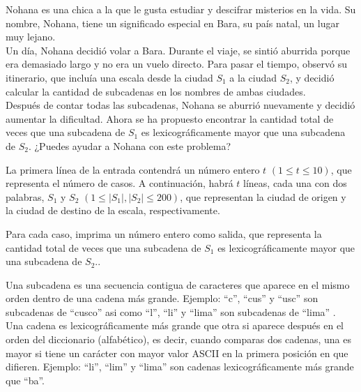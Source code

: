 
Nohana es una chica a la que le gusta estudiar y descifrar misterios en la vida. Su nombre, Nohana, tiene un significado especial en Bara, su país natal, un lugar muy lejano.\\

Un día, Nohana decidió volar a Bara. Durante el viaje, se sintió aburrida porque era demasiado largo y no era un vuelo directo. Para pasar el tiempo, observó su itinerario, que incluía una escala desde la ciudad $S_1$ a la ciudad $S_2$, y decidió calcular la cantidad de subcadenas en los nombres de ambas ciudades.\\

Después de contar todas las subcadenas, Nohana se aburrió nuevamente y decidió aumentar la dificultad. Ahora se ha propuesto encontrar la cantidad total de veces que una subcadena de $S_1$ es lexicográficamente mayor que una subcadena de $S_2$. ¿Puedes ayudar a Nohana con este problema?


La primera línea de la entrada contendrá un número entero $t$ $(1 \le t \le 10)$, que representa el número de casos. A continuación, habrá $t$ líneas, cada una con dos palabras, $S_1$ y $S_2$  $(1 \le |S_1|,|S_2| \le 200)$, que representan la ciudad de origen y la ciudad de destino de la escala, respectivamente.

\outputText

Para cada caso, imprima un número entero como salida, que representa la cantidad total de veces que una subcadena de $S_1$ es lexicográficamente mayor que una subcadena de $S_2$..

\exampleCases

\begin{example}
\end{example}

\explanationText

Una subcadena es una secuencia contigua de caracteres que aparece en el mismo orden dentro de una cadena más grande. Ejemplo: ``c'', ``cus'' y ``usc'' son subcadenas de ``cusco'' asi como ``l'', ``li'' y ``lima''  son subcadenas de ``lima'' .\\

Una cadena es lexicográficamente más grande que otra si aparece después en el orden del diccionario (alfabético), es decir, cuando comparas dos cadenas, una es mayor si tiene un carácter con mayor valor ASCII en la primera posición en que difieren. Ejemplo:  ``li'', ``lim'' y ``lima'' son  cadenas lexicográficamente más grande que  ``ba''.
